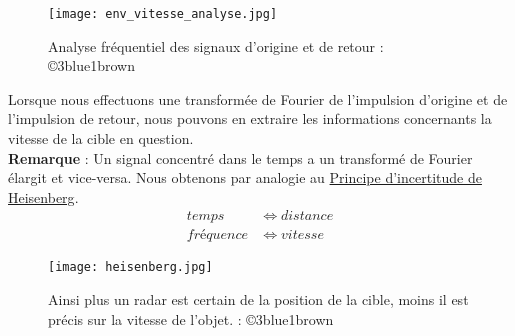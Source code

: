 \documentclass[a4paper]{book}
\begin{document}
\begin{figure}[H]
	\centering
	\texttt{[image: env\_vitesse\_analyse.jpg]}
	\caption{Analyse fréquentiel des signaux d'origine et de retour
	: ©3blue1brown }
\end{figure}

Lorsque nous effectuons une transformée de Fourier de l'impulsion d'origine 
et de l'impulsion de retour, nous pouvons en extraire les informations
concernants la vitesse de la cible en question.\\
\textbf{Remarque} : Un signal concentré dans le temps a un transformé de 
Fourier élargit et vice-versa. Nous obtenons par analogie au \underline{Principe 
d'incertitude de Heisenberg}. 
\begin{align*}
	temps &\Leftrightarrow distance \\
	fréquence &\Leftrightarrow vitesse 
\end{align*}
\begin{figure}[H]
	\centering
	\texttt{[image: heisenberg.jpg]}
	\caption{Ainsi plus un radar est certain de la position de la cible, 
	moins il est précis sur la vitesse de l'objet.
	: ©3blue1brown }
\end{figure}



 
\end{document}
